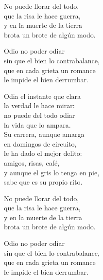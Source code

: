 \begin{lyrics}
No puede llorar del todo,\\
que la risa le hace guerra,\\
y en la muerte de la tierra\\
brota un brote de algún modo.

Odio no poder odiar\\
sin que el bien lo contrabalance,\\
que en cada grieta un romance\\
le impide el bien derrumbar.

Odia el instante que clara\\
la verdad le hace mirar:\\
no puede del todo odiar\\
la vida que lo ampara.\\
Su carrera, aunque amarga\\
en domingos de circuito,\\
le ha dado el mejor delito:\\
amigos, risas, café,\\
y aunque el gris lo tenga en pie,\\
sabe que es su propio rito.

No puede llorar del todo,\\
que la risa le hace guerra,\\
y en la muerte de la tierra\\
brota un brote de algún modo.

Odio no poder odiar\\
sin que el bien lo contrabalance,\\
que en cada grieta un romance\\
le impide el bien derrumbar.
\end{lyrics}
